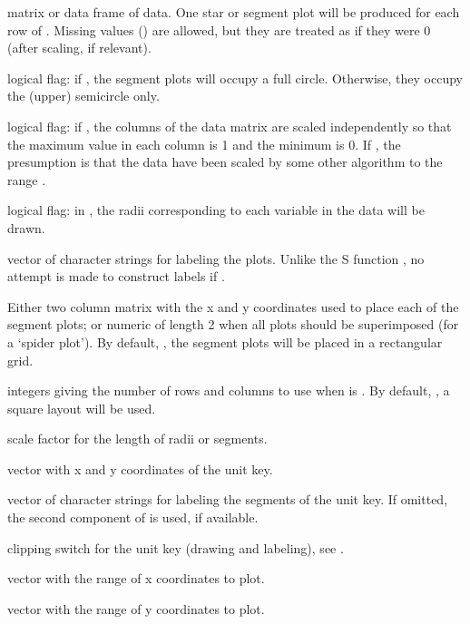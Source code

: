 %
\begin{Arguments}
\begin{ldescription}
\item[\code{x}] matrix or data frame of data.
One star or segment plot will be produced for each row of .
Missing values () are allowed, but they are treated as if
they were 0 (after scaling, if relevant).
\item[\code{full}] logical flag: if , the segment plots will
occupy a full circle.  Otherwise, they occupy the (upper) semicircle
only.
\item[\code{scale}] logical flag: if , the columns of the data
matrix are scaled independently so that the maximum value in each
column is 1 and the minimum is 0.  If , the presumption
is that the data have been scaled by some other algorithm to the
range \eqn{[0, 1]}{}.
\item[\code{radius}] logical flag: in , the radii corresponding to
each variable in the data will be drawn.
\item[\code{labels}] vector of character strings for labeling the plots.
Unlike the S function , no attempt is made to construct
labels if .
\item[\code{locations}] Either two column matrix with the x and y coordinates used
to place each of the segment plots; or numeric of length 2 when all
plots should be superimposed (for a `spider plot').
By default, , the segment plots will be
placed in a rectangular grid.
\item[\code{nrow, ncol}] integers giving the number of rows and columns to use when
 is .  By default, , a square
layout will be used.
\item[\code{len}] scale factor for the length of radii or segments.
\item[\code{key.loc}] vector with x and y coordinates of the unit key.
\item[\code{key.labels}] vector of character strings for labeling the
segments of the unit key.  If omitted, the second component of
 is used, if available.
\item[\code{key.xpd}] clipping switch for the unit key (drawing and
labeling), see .
\item[\code{xlim}] vector with the range of x coordinates to plot. 
\item[\code{ylim}] vector with the range of y coordinates to plot.

\end{ldescription}
\end{Arguments}
